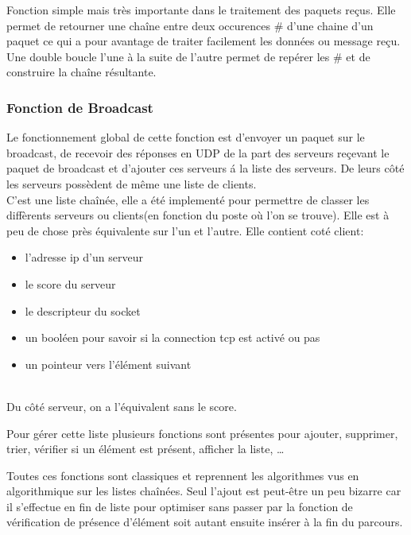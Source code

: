 \documentclass[14pt,a4paper]{report}
\begin{document}
Fonction simple mais tr\`es importante dans le traitement des paquets 
re\c{c}us. Elle permet de retourner une cha\^ine entre deux occurences \# d'une
chaine d'un paquet ce qui a pour avantage de traiter facilement  les 
donn\'ees ou message re\c{c}u. Une double boucle l'une \`a la 
suite de l'autre permet de rep\'erer les \# et de construire la cha\^ine 
r\'esultante.
\\

\subsubsection{Fonction de Broadcast}
Le fonctionnement global de cette fonction est d'envoyer un paquet sur le 
broadcast, de recevoir des r\'eponses en UDP de la part des serveurs 
re\c cevant le paquet de broadcast et d'ajouter ces serveurs \'a la liste des 
serveurs. De leurs c\^ot\'e les serveurs poss\`edent de m\^eme une liste de 
clients. \\

C'est une liste cha\^in\'ee, elle  a \'et\'e implement\'e pour permettre de 
classer les diff\`erents serveurs ou clients(en fonction du poste o\`u l'on se 
trouve). Elle est \`a peu de chose pr\`es \'equivalente sur l'un et l'autre. 
Elle contient cot\'e client: \\

\begin{itemize} 
\item l'adresse ip d'un serveur 
\item le score 
du serveur 
\item le descripteur du socket 
\item un bool\'een pour savoir si la connection tcp est activ\'e ou pas 
\item un pointeur vers l'\'el\'ement suivant 
\end{itemize} 
\rule{0cm}{0cm} \\

Du c\^ot\'e serveur, on a l'\'equivalent sans le score.
 
Pour g\'erer cette liste plusieurs fonctions sont pr\'esentes pour ajouter, 
supprimer, trier, v\'erifier si un \'el\'ement est pr\'esent, afficher la 
liste, \ldots 

Toutes ces fonctions sont classiques et reprennent les algorithmes vus en 
algorithmique sur les listes cha\^in\'ees. Seul l'ajout est peut-\^etre un peu 
bizarre car il s'effectue en fin de liste pour optimiser sans passer par la 
fonction de v\'erification de pr\'esence d'\'el\'ement soit autant ensuite 
ins\'erer \`a la fin du parcours. \\
\end{document}
